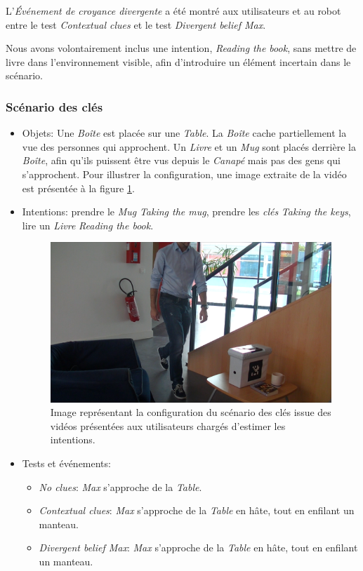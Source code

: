 \documentclass[a4paper,11pt,twoside]{StyleThese}
\begin{document}
L'\textit{Événement de croyance divergente} a été montré aux utilisateurs et au robot entre le test \textit{Contextual clues} et le test \textit{Divergent belief Max}. 

Nous avons volontairement inclus une intention, \textit{Reading the book}, sans mettre de livre dans l'environnement visible, afin d'introduire un élément incertain dans le scénario.

\subsubsection{Scénario des clés}
\begin{itemize}

\item Objets: Une \textit{Boîte} est placée sur une \textit{Table}. La \textit{Boîte} cache partiellement la vue des personnes qui approchent. Un \textit{Livre} et un \textit{Mug} sont placés derrière la \textit{Boîte}, afin qu'ils puissent être vus depuis le \textit{Canapé} mais pas des gens qui s'approchent. Pour illustrer la configuration, une image extraite de la vidéo est présentée à la figure \ref{fig:keyScen}.

\item Intentions: prendre le \textit{Mug} \textit{Taking the mug}, prendre les \textit{clés} \textit{Taking the keys}, lire un \textit{Livre} \textit{Reading the book}.



\begin{figure}[ht!]
  \centering
 \includegraphics[width=0.8\linewidth]{./intention/keys1.png} 
  \caption {Image représentant la configuration du scénario des clés issue des vidéos présentées aux utilisateurs chargés d'estimer les intentions.}
  \label{fig:keyScen}
\end{figure}


\item Tests et événements:
\begin{itemize}
\item \textit{No clues}: \textit{Max} s'approche de la \textit{Table}.
\item\textit{Contextual clues}: \textit{Max} s'approche de la \textit{Table} en hâte, tout en enfilant un manteau.
\item \textit{Divergent belief Max}: \textit{Max} s'approche de la \textit{Table} en hâte, tout en enfilant un manteau.
\end{itemize}


\end{itemize}
\end{document}
